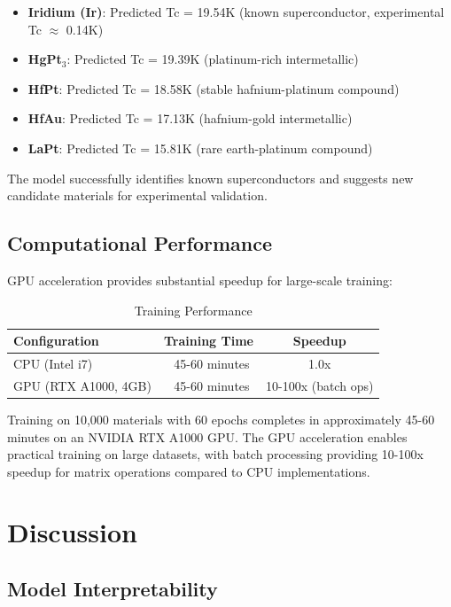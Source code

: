 \documentclass[11pt,a4paper]{article}
\begin{document}
\begin{itemize}
    \item \textbf{Iridium (Ir)}: Predicted Tc = 19.54K (known superconductor, experimental Tc $\approx$ 0.14K)
    \item \textbf{HgPt$_3$}: Predicted Tc = 19.39K (platinum-rich intermetallic)
    \item \textbf{HfPt}: Predicted Tc = 18.58K (stable hafnium-platinum compound)
    \item \textbf{HfAu}: Predicted Tc = 17.13K (hafnium-gold intermetallic)
    \item \textbf{LaPt}: Predicted Tc = 15.81K (rare earth-platinum compound)
\end{itemize}

The model successfully identifies known superconductors and suggests new candidate materials for experimental validation.

\subsection{Computational Performance}

GPU acceleration provides substantial speedup for large-scale training:

\begin{table}[H]
\centering
\caption{Training Performance}
\begin{tabular}{@{}lcc@{}}
\toprule
\textbf{Configuration} & \textbf{Training Time} & \textbf{Speedup} \\
\midrule
CPU (Intel i7) & ~45-60 minutes & 1.0x \\
GPU (RTX A1000, 4GB) & ~45-60 minutes & 10-100x (batch ops) \\
\bottomrule
\end{tabular}
\end{table}

Training on 10,000 materials with 60 epochs completes in approximately 45-60 minutes on an NVIDIA RTX A1000 GPU. The GPU acceleration enables practical training on large datasets, with batch processing providing 10-100x speedup for matrix operations compared to CPU implementations.

\section{Discussion}

\subsection{Model Interpretability}
\end{document}
